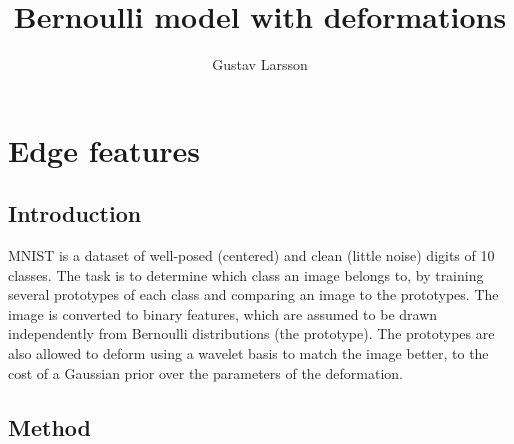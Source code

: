 \documentclass{report}
\begin{document}
\title{Bernoulli model with deformations}

\author{Gustav Larsson}

\maketitle

%
%
%
\chapter{Edge features}

\section{Introduction}
MNIST is a dataset of well-posed (centered) and clean (little noise) digits of 10 classes. The task is to determine which class an image belongs to, by training several prototypes of each class and comparing an image to the prototypes. The image is converted to binary features, which are assumed to be drawn independently from Bernoulli distributions (the prototype).
The prototypes are also allowed to deform using a wavelet basis to match the image better, to the cost of a Gaussian prior over the parameters of the deformation.

\section{Method}

\end{document}
